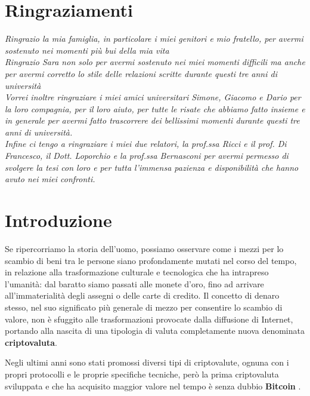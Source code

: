 \chapter*{Ringraziamenti} %
\begin{flushright}
\itshape 
Ringrazio la mia famiglia, in particolare i miei genitori e mio fratello, per avermi sostenuto nei momenti più bui della mia vita\\
Ringrazio Sara non solo per avermi sostenuto nei miei momenti difficili ma anche per avermi corretto lo stile delle relazioni scritte durante questi tre anni di università\\ 
Vorrei inoltre ringraziare i miei amici universitari Simone, Giacomo e Dario per la loro compagnia, per il loro aiuto, per tutte le risate che abbiamo fatto insieme e in generale per avermi fatto trascorrere dei bellissimi momenti durante questi tre anni di università.\\
Infine ci tengo a ringraziare i miei due relatori, la prof.ssa Ricci e il prof. Di Francesco, il Dott. Loporchio e la prof.ssa Bernasconi per avermi permesso di svolgere la tesi con loro e per tutta l'immensa pazienza e disponibilità che hanno avuto nei miei confronti.
\end{flushright}


\chapter{Introduzione}
Se ripercorriamo la storia dell'uomo, possiamo osservare come i mezzi per lo scambio di beni tra le persone siano profondamente mutati nel corso del tempo, in relazione alla trasformazione culturale e tecnologica che ha intrapreso l'umanità: dal baratto siamo passati alle monete d’oro, fino ad arrivare all’immaterialità degli assegni o delle carte di credito. Il concetto di denaro stesso, nel suo significato più generale di mezzo per consentire lo scambio di valore, non è sfuggito alle trasformazioni provocate dalla diffusione di Internet, portando alla nascita di una tipologia di valuta completamente nuova denominata \textbf{criptovaluta}. 

Negli ultimi anni sono stati promossi diversi tipi di criptovalute, ognuna con i propri protocolli e le proprie specifiche tecniche, però la prima criptovaluta sviluppata e che ha acquisito maggior valore nel tempo è senza dubbio \textbf{Bitcoin} \cite{btcbook}. 

